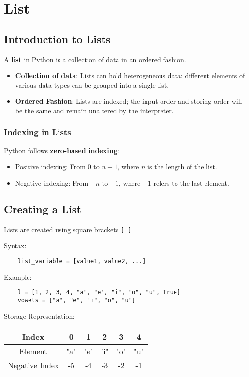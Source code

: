 \chapter{List}

\section{Introduction to Lists}
A \textbf{list} in Python is a collection of data in an ordered fashion.

\begin{itemize}
	\item \textbf{Collection of data}: Lists can hold heterogeneous data; different elements of various data types can be grouped into a single list.
	\item \textbf{Ordered Fashion}: Lists are indexed; the input order and storing order will be the same and remain unaltered by the interpreter.
\end{itemize}

\subsection{Indexing in Lists}
Python follows \textbf{zero-based indexing}:
\begin{itemize}
	\item Positive indexing: From $0$ to $n-1$, where $n$ is the length of the list.
	\item Negative indexing: From $-n$ to $-1$, where $-1$ refers to the last element.
\end{itemize}

\section{Creating a List}
Lists are created using square brackets \texttt{[ ]}.

\noindent Syntax:
\begin{verbatim}
	list_variable = [value1, value2, ...]
\end{verbatim}

\noindent Example:
\begin{verbatim}
	l = [1, 2, 3, 4, "a", "e", "i", "o", "u", True]
	vowels = ["a", "e", "i", "o", "u"]
\end{verbatim}

\noindent Storage Representation:
\begin{center}
	\begin{tabular}{c|c|c|c|c|c}
		Index & 0 & 1 & 2 & 3 & 4 \\
		\hline
		Element & "a" & "e" & "i" & "o" & "u" \\
		\hline
		Negative Index & -5 & -4 & -3 & -2 & -1 \\
	\end{tabular}
\end{center}

